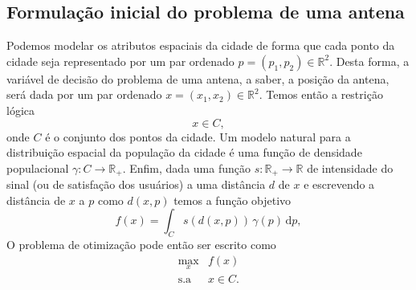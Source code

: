 \documentclass[a4paper,12pt]{article}
\begin{document}
\subsection{Formulação inicial do problema de uma antena}
\def\RR{\mathbb{R}}
\def\g{\gamma}

Podemos modelar os atributos espaciais da cidade de forma que cada ponto da cidade seja representado por um par ordenado $p = (p_1,p_2) \in \RR^2$. Desta forma, a variável de decisão do problema de uma antena, a saber, a posição da antena, será dada por um par ordenado $x = (x_1,x_2) \in \RR^2$. Temos então a restrição lógica
\begin{equation*}
	x \in C ,
\end{equation*}
onde $C$ é o conjunto dos pontos da cidade. Um modelo natural para a distribuição espacial da população da cidade é uma função de densidade populacional $\g : C \rightarrow \RR_{+}$. Enfim, dada uma função $s : \RR_{+} \rightarrow \RR $ de intensidade do sinal (ou de satisfação dos usuários) a uma distância $d$ de $x$ e escrevendo a distância de $x$ a $p$ como $d(x,p)$ temos a função objetivo
\begin{equation}
	\label{f_obj}
	f(x) = \int_C s(d(x,p)) \, \g(p) \, \text{d}p ,
\end{equation}
O problema de otimização pode então ser escrito como
\begin{equation}
	\label{pb}
	\begin{array}{rl}
		\max_{x} & f(x) \\[0.5ex]
		\text{s.a} & x \in C .
	\end{array}
	\tag{P1}
\end{equation}
\end{document}
